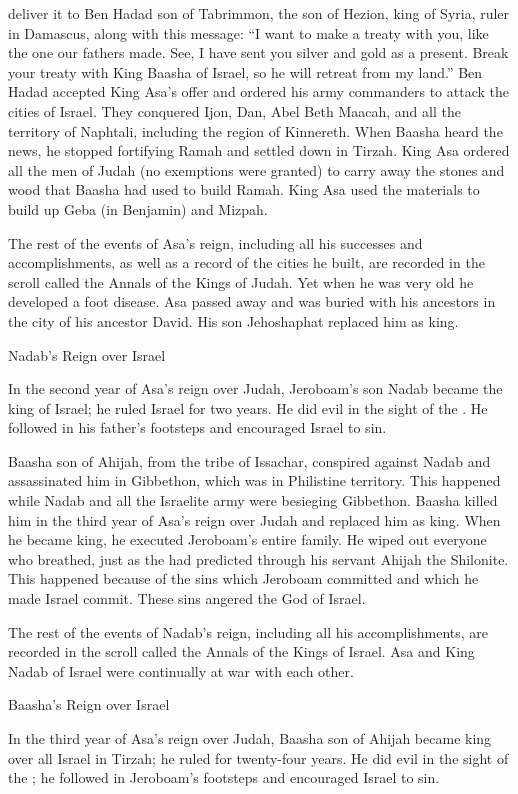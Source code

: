 {deliver
it to Ben Hadad
son
of Tabrimmon,
the son
of Hezion,
king
of Syria,
ruler
in Damascus,
along with this message:
“I want to make a treaty
with
you, like the one our fathers
made. See,
I have sent
you silver
and gold
as a present.
Break
your treaty
with
King
Baasha
of Israel,
so he will retreat from my land.”
Ben Hadad
accepted
King
Asa’s
offer and ordered
his army
commanders
to
attack the cities
of Israel.
They conquered
Ijon,
Dan,
Abel Beth Maacah,
and all
the territory
of Naphtali,
including the region
of Kinnereth.
When
Baasha
heard
the news, he stopped
fortifying
Ramah
and settled
down in Tirzah.
King
Asa
ordered
all
the men of Judah
(no
exemptions
were granted) to carry
away the
stones
and wood
that
Baasha
had used to build
Ramah.
King
Asa
used the materials to build up Geba
(in Benjamin) and Mizpah.
\par }{\PP {}The rest
of the events
of Asa’s
reign, including all
his successes
and accomplishments,
as well as
a
record of the cities
he built,
are
recorded
in the scroll
called the Annals
of the Kings
of Judah.
Yet
when he was
very old he developed
a foot disease.
Asa
passed away
and was buried
with
his ancestors
in the city
of his ancestor
David.
His son
Jehoshaphat
replaced
him as king.
\par }{\SH Nadab’s Reign over Israel
\par }{\PP {}In the second year
of Asa’s
reign over
Judah,
Jeroboam’s
son
Nadab
became the king
of Israel;
he ruled
Israel
for two
years.
He did
evil
in the sight
of the
{}. He followed
in his father’s
footsteps
and encouraged
Israel
to sin.
\par }{\PP {}Baasha
son
of Ahijah,
from the tribe
of Issachar,
conspired
against
Nadab
and assassinated
him in Gibbethon,
which
was in Philistine
territory. This happened while Nadab
and all
the Israelite
army were besieging
Gibbethon.
Baasha
killed
him in the third
year
of Asa’s
reign over
Judah
and replaced him as king.
When
he became king,
he executed
Jeroboam’s
entire
family.
He wiped out
everyone
who breathed,
just as
the {}
had
predicted
through
his servant
Ahijah
the Shilonite.
This happened because
of the sins
which
Jeroboam
committed
and which
he made Israel
commit. These sins angered
the {}
God
of Israel.
\par }{\PP {}The rest
of the events
of Nadab’s
reign, including all
his accomplishments,
are recorded
in the scroll
called the Annals
of the Kings
of Israel.
Asa
and King
Nadab
of Israel
were continually
at
war
with each other.
\par }{\SH Baasha’s Reign over Israel
\par }{\PP {}In the third
year
of Asa’s
reign over
Judah,
Baasha
son
of Ahijah
became king
over
all
Israel
in Tirzah;
he ruled for twenty-four
years.
He did
evil
in the sight
of the
{}; he followed
in Jeroboam’s
footsteps
and encouraged
Israel
to sin.

}
